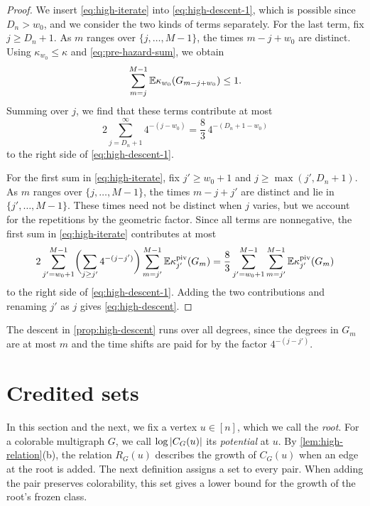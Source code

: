 \begin{proof}
We insert \eqref{eq:high-iterate} into \eqref{eq:high-descent-1}, which is possible since $D_n > w_0$, and we consider the two kinds of terms separately. For the last term, fix $j \ge D_n + 1$. As $m$ ranges over $\{j, \dots, M - 1\}$, the times $m - j + w_0$ are distinct. Using $\kappa_{w_0} \le \kappa$ and \eqref{eq:pre-hazard-sum}, we obtain
\[
\sum_{m = j}^{M - 1} \mathbb E \kappa_{w_0}(G_{m - j + w_0}) \le 1.
\]
Summing over $j$, we find that these terms contribute at most
\[
2 \sum_{j = D_n + 1}^{\infty} 4^{-(j - w_0)} = \frac{8}{3} \, 4^{-(D_n + 1 - w_0)}
\]
to the right side of \eqref{eq:high-descent-1}.

For the first sum in \eqref{eq:high-iterate}, fix $j' \ge w_0 + 1$ and $j \ge \max(j', D_n + 1)$. As $m$ ranges over $\{j, \dots, M - 1\}$, the times $m - j + j'$ are distinct and lie in $\{j', \dots, M - 1\}$. These times need not be distinct when $j$ varies, but we account for the repetitions by the geometric factor. Since all terms are nonnegative, the first sum in \eqref{eq:high-iterate} contributes at most
\[
2 \sum_{j' = w_0 + 1}^{M - 1} \biggl( \sum_{j \ge j'} 4^{-(j - j')} \biggr) \sum_{m = j'}^{M - 1} \mathbb E \kappa_{j'}^{\rm piv}(G_m) = \frac{8}{3} \sum_{j' = w_0 + 1}^{M - 1} \sum_{m = j'}^{M - 1} \mathbb E \kappa_{j'}^{\rm piv}(G_m)
\]
to the right side of \eqref{eq:high-descent-1}. Adding the two contributions and renaming $j'$ as $j$ gives \eqref{eq:high-descent}.
\end{proof}

The descent in \cref{prop:high-descent} runs over all degrees, since the degrees in $G_m$ are at most $m$ and the time shifts are paid for by the factor $4^{-(j - j')}$.

\section{Credited sets}\label{sec:high-relation}

In this section and the next, we fix a vertex $u \in [n]$, which we call the \emph{root}. For a colorable multigraph $G$, we call $\log \left|C_G(u)\right|$ its \emph{potential} at $u$. By \cref{lem:high-relation}(b), the relation $R_G(u)$ describes the growth of $C_G(u)$ when an edge at the root is added. The next definition assigns a set to every pair. When adding the pair preserves colorability, this set gives a lower bound for the growth of the root's frozen class.

